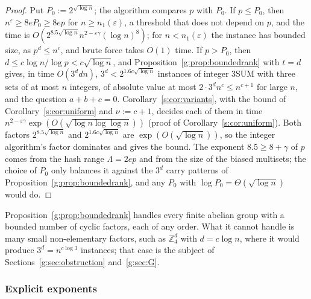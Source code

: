 \documentclass[11pt]{article}
\theoremstyle{definition}
\theoremstyle{remark}
\newcommand{\Z}{\mathbb{Z}}
\newcommand{\eps}{\varepsilon}
\begin{document}
\begin{proof}
Put $P_0:=2^{\sqrt{\log n}}$; the algorithm compares $p$ with $P_0$. If $p\le P_0$, then $n^\eps\ge8eP_0\ge8ep$ for $n\ge n_1(\eps)$, a threshold that does not depend on $p$, and the time is $O(2^{8.5\sqrt{\log n}}n^{2-\eps\gamma}(\log n)^8)$; for $n<n_1(\eps)$ the instance has bounded size, as $p^d\le n^c$, and brute force takes $O(1)$ time. If $p>P_0$, then $d\le c\log n/\log p<c\sqrt{\log n}$, and Proposition~\ref{g:prop:boundedrank} with $t=d$ gives, in time $O(3^ddn)$, $3^d<2^{1.6c\sqrt{\log n}}$ instances of integer 3SUM with three sets of at most $n$ integers, of absolute value at most $2\cdot3^dn^c\le n^{c+1}$ for large $n$, and the question $a+b+c=0$. Corollary~\ref{s:cor:variants}, with the bound of Corollary~\ref{s:cor:uniform} and $\nu:=c+1$, decides each of them in time $n^{2-\eps\gamma}\exp(O(\sqrt{\log n\log\log n}))$ (proof of Corollary~\ref{s:cor:uniform}). Both factors $2^{8.5\sqrt{\log n}}$ and $2^{1.6c\sqrt{\log n}}$ are $\exp(O(\sqrt{\log n}))$, so the integer algorithm's factor dominates and gives the bound. The exponent $8.5\ge8+\gamma$ of $p$ comes from the hash range $\Lambda=2ep$ and from the size of the biased multisets; the choice of $P_0$ only balances it against the $3^d$ carry patterns of Proposition~\ref{g:prop:boundedrank}, and any $P_0$ with $\log P_0=\Theta(\sqrt{\log n})$ would do.
\end{proof}

Proposition~\ref{g:prop:boundedrank} handles every finite abelian group with a bounded number of cyclic factors, each of any order. What it cannot handle is many small non-elementary factors, such as $\Z_4^d$ with $d=c\log n$, where it would produce $3^d=n^{c\log3}$ instances; that case is the subject of Sections~\ref{g:sec:obstruction} and~\ref{g:sec:G}.

\subsubsection{Explicit exponents}
\end{document}
